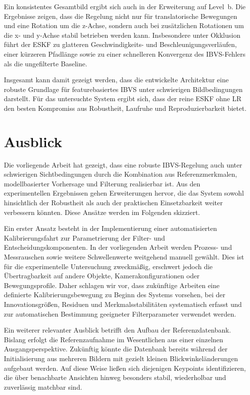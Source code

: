 Ein konsistentes Gesamtbild ergibt sich auch in der Erweiterung auf Level~b. Die Ergebnisse zeigen, dass die Regelung nicht nur für translatorische Bewegungen und eine Rotation um die z-Achse, sondern auch bei zusätzlichen Rotationen um die x- und y-Achse stabil betrieben werden kann. Insbesondere unter Okklusion führt der \ac{ESKF} zu glatteren Geschwindigkeits- und Beschleunigungsverläufen, einer kürzeren Pfadlänge sowie zu einer schnelleren Konvergenz des \ac{IBVS}-Fehlers als die ungefilterte Baseline.

Insgesamt kann damit gezeigt werden, dass die entwickelte Architektur eine robuste Grundlage für featurebasiertes \ac{IBVS} unter schwierigen Bildbedingungen darstellt. Für das untersuchte System ergibt sich, dass der reine \ac{ESKF} ohne \ac{LR} den besten Kompromiss aus Robustheit, Laufruhe und Reproduzierbarkeit bietet.

\section{Ausblick}

Die vorliegende Arbeit hat gezeigt, dass eine robuste \ac{IBVS}-Regelung auch unter schwierigen Sichtbedingungen durch die Kombination aus Referenzmerkmalen, modellbasierter Vorhersage und Filterung realisierbar ist. Aus den experimentellen Ergebnissen gehen Erweiterungen hervor, die das System sowohl hinsichtlich der Robustheit als auch der praktischen Einsetzbarkeit weiter verbessern könnten. Diese Ansätze werden im Folgenden skizziert.

Ein erster Ansatz besteht in der Implementierung einer automatisierten Kalibrierungsfahrt zur Parametrierung der Filter- und Entscheidungskomponenten. In der vorliegenden Arbeit werden Prozess- und Messrauschen sowie weitere Schwellenwerte weitgehend manuell gewählt. Dies ist für die experimentelle Untersuchung zweckmäßig, erschwert jedoch die Übertragbarkeit auf andere Objekte, Kamerakonfigurationen oder Bewegungsprofile. Daher schlagen wir vor, dass zukünftige Arbeiten eine definierte Kalibrierungsbewegung zu Beginn des Systems vorsehen, bei der Innovationsgrößen, Residuen und Merkmalsstabilitäten systematisch erfasst und zur automatischen Bestimmung geeigneter Filterparameter verwendet werden.

Ein weiterer relevanter Ausblick betrifft den Aufbau der Referenzdatenbank. Bislang erfolgt die Referenzaufnahme im Wesentlichen aus einer einzelnen Ausgangsperspektive. Zukünftig könnte die Datenbank bereits während der Initialisierung aus mehreren Bildern mit gezielt kleinen Blickwinkeländerungen aufgebaut werden. Auf diese Weise ließen sich diejenigen Keypoints identifizieren, die über benachbarte Ansichten hinweg besonders stabil, wiederholbar und zuverlässig matchbar sind.

